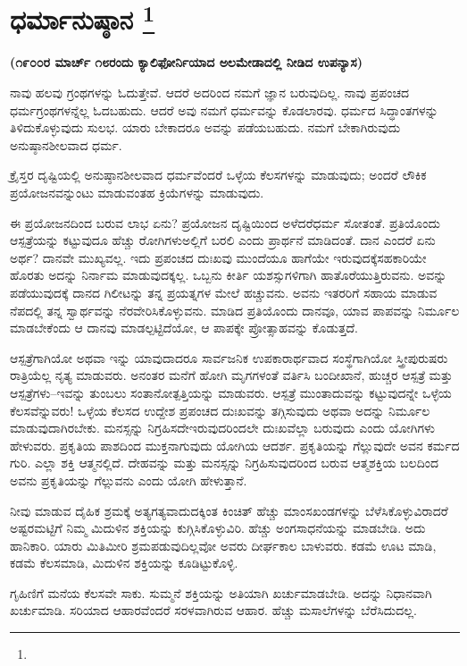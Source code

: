 
\chapter[ಧರ್ಮಾನುಷ್ಠಾನ ]{ಧರ್ಮಾನುಷ್ಠಾನ \protect\footnote{}}

\begin{center}
\textbf{(೧೯೦೦ರ ಮಾರ್ಚ್​ ೧೮ರಂದು ಕ್ಯಾಲಿಫೋರ್ನಿಯಾದ ಅಲಮೇಡಾದಲ್ಲಿ ನೀಡಿದ\general{\break } ಉಪನ್ಯಾಸ)}
\end{center}

ನಾವು ಹಲವು ಗ್ರಂಥಗಳನ್ನು ಓದುತ್ತೇವೆ. ಆದರೆ ಅದರಿಂದ ನಮಗೆ ಜ್ಞಾನ ಬರುವುದಿಲ್ಲ. ನಾವು ಪ್ರಪಂಚದ ಧರ್ಮಗ್ರಂಥಗಳನ್ನೆಲ್ಲ ಓದಬಹುದು. ಆದರೆ ಅವು ನಮಗೆ ಧರ್ಮವನ್ನು ಕೊಡಲಾರವು. ಧರ್ಮದ ಸಿದ್ಧಾಂತಗಳನ್ನು ತಿಳಿದುಕೊಳ್ಳುವುದು ಸುಲಭ. ಯಾರು ಬೇಕಾದರೂ ಅವನ್ನು ಪಡೆಯಬಹುದು. ನಮಗೆ ಬೇಕಾಗಿರುವುದು ಅನುಷ್ಠಾನಶೀಲವಾದ ಧರ್ಮ.

ಕ್ರೈಸ್ತರ ದೃಷ್ಟಿಯಲ್ಲಿ ಅನುಷ್ಠಾನಶೀಲವಾದ ಧರ್ಮವೆಂದರೆ ಒಳ್ಳೆಯ ಕೆಲಸಗಳನ್ನು ಮಾಡುವುದು; ಅಂದರೆ ಲೌಕಿಕ ಪ್ರಯೋಜನವನ್ನುಂಟು ಮಾಡುವಂತಹ ಕ್ರಿಯೆಗಳನ್ನು ಮಾಡುವುದು.

ಈ ಪ್ರಯೋಜನದಿಂದ ಬರುವ ಲಾಭ ಏನು? ಪ್ರಯೋಜನ ದೃಷ್ಟಿಯಿಂದ ಅಳೆದರೆ\break ಧರ್ಮ ಸೋತಂತೆ. ಪ್ರತಿಯೊಂದು ಆಸ್ಪತ್ರೆಯನ್ನು ಕಟ್ಟುವುದೂ ಹೆಚ್ಚು ರೋಗಿಗಳು\break ಅಲ್ಲಿಗೆ ಬರಲಿ ಎಂದು ಪ್ರಾರ್ಥನೆ ಮಾಡಿದಂತೆ. ದಾನ ಎಂದರೆ ಏನು ಅರ್ಥ? ದಾನವೇ ಮುಖ್ಯವಲ್ಲ. ಇದು ಪ್ರಪಂಚದ ದುಃಖವು ಮುಂದೆಯೂ ಹಾಗೆಯೇ ಇರುವುದಕ್ಕೆ\break ಸಹಕಾರಿಯೇ ಹೊರತು ಅದನ್ನು ನಿರ್ನಾಮ ಮಾಡುವುದಕ್ಕಲ್ಲ. ಒಬ್ಬನು ಕೀರ್ತಿ ಯಶಸ್ಸುಗಳಿಗಾಗಿ ಹಾತೊರೆಯುತ್ತಿರುವನು. ಅವನ್ನು ಪಡೆಯುವುದಕ್ಕೆ ದಾನದ ಗಿಲೀಟನ್ನು ತನ್ನ ಪ್ರಯತ್ನಗಳ ಮೇಲೆ ಹಚ್ಚುವನು. ಅವನು ಇತರರಿಗೆ ಸಹಾಯ ಮಾಡುವ ನೆಪದಲ್ಲಿ ತನ್ನ ಸ್ವಾರ್ಥವನ್ನು ನೆರವೇರಿಸಿಕೊಳ್ಳುವನು. ಮಾಡಿದ ಪ್ರತಿಯೊಂದು ದಾನವೂ, ಯಾವ ಪಾಪವನ್ನು ನಿರ್ಮೂಲ ಮಾಡಬೇಕೆಂದು ಆ ದಾನವು ಮಾಡಲ್ಪಟ್ಟಿದೆಯೋ, ಆ ಪಾಪಕ್ಕೇ ಪ್ರೋತ್ಸಾಹವನ್ನು ಕೊಡುತ್ತದೆ.

ಆಸ್ಪತ್ರೆಗಾಗಿಯೋ ಅಥವಾ ಇನ್ನು ಯಾವುದಾದರೂ ಸಾರ್ವಜನಿಕ ಉಪಕಾರಾರ್ಥ\-ವಾದ ಸಂಸ್ಥೆಗಾಗಿಯೋ ಸ್ತ್ರೀಪುರುಷರು ರಾತ್ರಿಯೆಲ್ಲ ನೃತ್ಯ ಮಾಡುವರು. ಅನಂತರ ಮನೆಗೆ ಹೋಗಿ ಮೃಗಗಳಂತೆ ವರ್ತಿಸಿ ಬಂದೀಖಾನೆ, ಹುಚ್ಚರ ಆಸ್ಪತ್ರೆ ಮತ್ತು ಆಸ್ಪತ್ರೆಗಳು–ಇವನ್ನು ತುಂಬಲು ಸಂತಾನೋತ್ಪತ್ತಿಯನ್ನು ಮಾಡುವರು. ಆಸ್ಪತ್ರೆ ಮುಂತಾದುವನ್ನು ಕಟ್ಟುವುದನ್ನೇ ಒಳ್ಳೆಯ ಕೆಲಸವೆನ್ನುವರು! ಒಳ್ಳೆಯ ಕೆಲಸದ ಉದ್ದೇಶ ಪ್ರಪಂಚದ ದುಃಖವನ್ನು ತಗ್ಗಿಸುವುದು ಅಥವಾ ಅದನ್ನು ನಿರ್ಮೂಲ ಮಾಡುವುದಾಗಿರಬೇಕು. ಮನಸ್ಸನ್ನು ನಿಗ್ರಹಿಸದೇ\break ಇರುವುದರಿಂದಲೇ ದುಃಖವೆಲ್ಲಾ ಬರುವುದು ಎಂದು ಯೋಗಿಗಳು ಹೇಳುವರು. ಪ್ರಕೃತಿಯ ಪಾಶದಿಂದ ಮುಕ್ತನಾಗುವುದು ಯೋಗಿಯ ಆದರ್ಶ. ಪ್ರಕೃತಿಯನ್ನು ಗೆಲ್ಲುವುದೇ ಅವನ ಕರ್ಮದ ಗುರಿ. ಎಲ್ಲಾ ಶಕ್ತಿ ಆತ್ಮನಲ್ಲಿದೆ. ದೇಹವನ್ನು ಮತ್ತು ಮನಸ್ಸನ್ನು ನಿಗ್ರಹಿಸುವುದರಿಂದ ಬರುವ ಆತ್ಮಶಕ್ತಿಯ ಬಲದಿಂದ ಅವನು ಪ್ರಕೃತಿಯನ್ನು ಗೆಲ್ಲುವನು ಎಂದು ಯೋಗಿ ಹೇಳುತ್ತಾನೆ.

ನೀವು ಮಾಡುವ ದೈಹಿಕ ಶ್ರಮಕ್ಕೆ ಅತ್ಯಗತ್ಯವಾದುದಕ್ಕಿಂತ ಕಿಂಚಿತ್​ ಹೆಚ್ಚು ಮಾಂಸಖಂಡಗಳನ್ನು ಬೆಳೆಸಿಕೊಳ್ಳುವಿರಾದರೆ ಅಷ್ಟರಮಟ್ಟಿಗೆ ನಿಮ್ಮ ಮಿದುಳಿನ ಶಕ್ತಿಯನ್ನು ಕುಗ್ಗಿಸಿಕೊಳ್ಳುವಿರಿ. ಹೆಚ್ಚು ಅಂಗಸಾಧನೆಯನ್ನು ಮಾಡಬೇಡಿ. ಅದು ಹಾನಿಕಾರಿ. ಯಾರು ಮಿತಿಮೀರಿ ಶ್ರಮಪಡುವುದಿಲ್ಲವೋ ಅವರು ದೀರ್ಘಕಾಲ ಬಾಳುವರು. ಕಡಮೆ ಊಟ ಮಾಡಿ, ಕಡಮೆ ಕೆಲಸಮಾಡಿ, ಮಿದುಳಿನ ಶಕ್ತಿಯನ್ನು ಕೂಡಿಟ್ಟುಕೊಳ್ಳಿ.

ಗೃಹಿಣಿಗೆ ಮನೆಯ ಕೆಲಸವೇ ಸಾಕು. ಸುಮ್ಮನೆ ಶಕ್ತಿಯನ್ನು ಅತಿಯಾಗಿ ಖರ್ಚುಮಾಡಬೇಡಿ. ಅದನ್ನು ನಿಧಾನವಾಗಿ ಖರ್ಚುಮಾಡಿ. ಸರಿಯಾದ ಆಹಾರವೆಂದರೆ ಸರಳವಾಗಿರುವ ಆಹಾರ. ಹೆಚ್ಚು ಮಸಾಲೆಗಳನ್ನು ಬೆರೆಸಿದುದಲ್ಲ.

